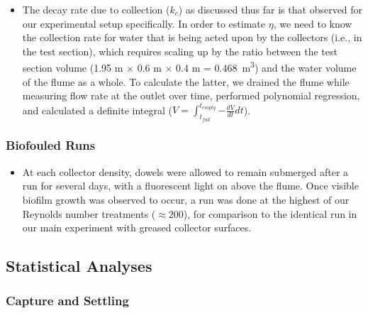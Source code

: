 \documentclass{article}
\begin{document}
\begin{itemize}
    \item The decay rate due to collection ($k_c$) as discussed thus far is that observed for our experimental setup specifically. In order to estimate $\eta$, we need to know the collection rate for water that is being acted upon by the collectors (i.e., in the test section), which requires scaling up by the ratio between the test section volume (1.95 m $\times$ 0.6 m $\times$ 0.4 m = \SI{0.468}{m^3}) and the water volume of the flume as a whole. To calculate the latter, we drained the flume while measuring flow rate at the outlet over time, performed polynomial regression, and calculated a definite integral ($V = \int_{t_{full}}^{t_{empty}}{-\frac{dV}{dt}dt}$). 
\end{itemize}

\subsubsection{Biofouled Runs}

\begin{itemize}
    \item At each collector density, dowels were allowed to remain submerged after a run for several days, with a fluorescent light on above the flume. Once visible biofilm growth was observed to occur, a run was done at the highest of our Reynolds number treatments ($\approx200$), for comparison to the identical run in our main experiment with greased collector surfaces.
\end{itemize}

\subsection{Statistical Analyses}

\subsubsection{Capture and Settling}
\end{document}
